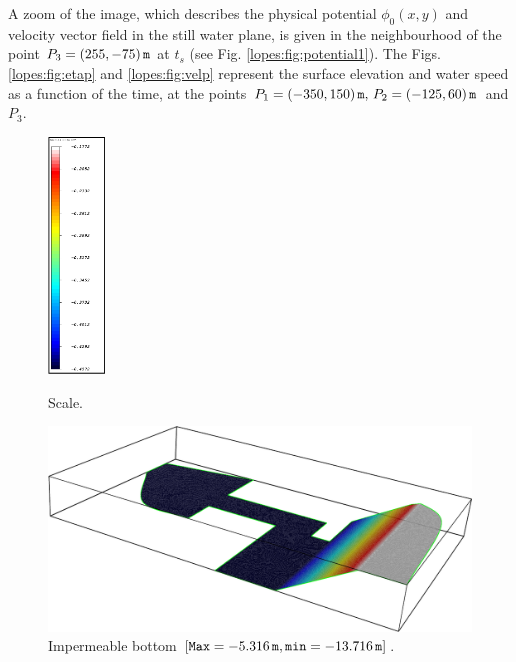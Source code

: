  A zoom of the image, which  describes
the physical potential \(\phi_0(x,y)\) and velocity vector field in the still
water plane, is given in  the neighbourhood of  the
point \(P_3=(255,-75)\,{\tt m}\) at \(t_s\) (see
Fig. \ref{lopes:fig:potential1}).
The Figs. \ref{lopes:fig:etap} and \ref{lopes:fig:velp} represent
 the surface elevation and water speed as a function of the
 time, at the
points \(P_1=(-350, 150)\,{\tt m},\, P_2=(-125,60)\,{\tt
m}\) and \(P_3\).
\begin{figure}[!htb]
\begin{minipage}[t]{0.3\linewidth}
{\centering
\includegraphics[width=1.5cm]{chapters/lopes/pdf/table.pdf}
\caption{Scale.}\label{lopes:fig:scale}\par}
\end{minipage}\hfill
\begin{minipage}[t]{0.7\linewidth}
{\centering
\includegraphics[width=\largefig]{chapters/lopes/pdf/depth.pdf}
\caption{Impermeable bottom $[{\tt Max}=-5.316\,{\tt m},{\tt min}=-13.716\,{\tt m}]$.}
\label{lopes:fig:harbour_depth}\par}
\end{minipage}
\end{figure}
